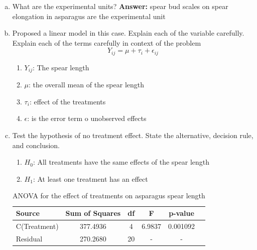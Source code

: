 \documentclass{article}
\begin{document}
\begin{enumerate}[(a)]
	\item What are the experimental units?
	      \textbf{Answer:} spear bud scales on spear elongation in asparagus are the experimental unit
	\item Proposed a linear model in this case. Explain each of the variable carefully.
	      Explain each of the terms carefully in context of the problem
	      $$
		      Y_{ij}= \mu + \tau_i + \epsilon_{ij}
	      $$
	      \begin{enumerate}
		      \item $Y_{ij}$: The spear length
		      \item $\mu$: the overall mean of the spear length
		      \item $\tau_i$: effect of the treatments
		      \item $\epsilon$: is the error term o unobserved effects
	      \end{enumerate}
	\item Test the hypothesis of no treatment effect. State the alternative, decision rule, and conclusion.
	      \begin{enumerate}
		      \item $H_0$: All treatments have the same effects of the spear length
		      \item $H_1$: At least one treatment has an effect
	      \end{enumerate}

	      \begin{table}[!ht]
		      \centering
		      \caption{ANOVA for the effect of treatments on asparagus spear length}
		      \begin{tabular}{lccccc}
			      \hline
			      \textbf{Source} & \textbf{Sum of Squares} & \textbf{df} & \textbf{F} & \textbf{p-value} \\
			      \hline
			      C(Treatment)    & 377.4936                & 4           & 6.9837     & 0.001092         \\
			      Residual        & 270.2680                & 20          & -          & -                \\
			      \hline
		      \end{tabular}
	      \end{table}


\end{enumerate}
\end{document}
